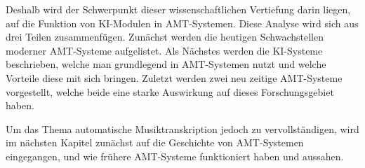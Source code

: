 Deshalb wird der Schwerpunkt dieser wissenschaftlichen Vertiefung darin liegen,
auf die Funktion von KI-Modulen in AMT-Systemen.
Diese Analyse wird sich aus drei Teilen zusammenfügen.
Zunächst werden die heutigen Schwachstellen moderner AMT-Systeme aufgelistet.
Als Nächstes werden die KI-Systeme beschrieben,
welche man grundlegend in AMT-Systemen nutzt und welche Vorteile diese mit sich bringen.
Zuletzt werden zwei neu zeitige AMT-Systeme vorgestellt,
welche beide eine starke Auswirkung auf dieses Forschungsgebiet haben.

Um das Thema automatische Musiktranskription jedoch zu vervollständigen,
wird im nächsten Kapitel zunächst auf die Geschichte von AMT-Systemen eingegangen,
und wie frühere AMT-Systeme funktioniert haben und aussahen.